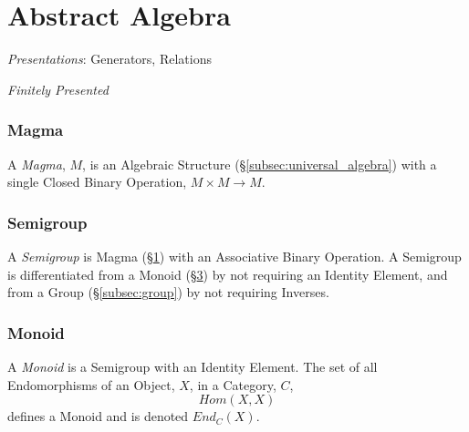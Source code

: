 \part{Abstract Algebra}\label{sec:abstract_algebra}

\emph{Presentations}: Generators, Relations

\emph{Finitely Presented}



\section{Magma}\label{subsec:magma}

A \emph{Magma}, $M$, is an Algebraic Structure
(\S\ref{subsec:universal_algebra}) with a single Closed Binary
Operation, $M \times M \rightarrow M$.



\section{Semigroup}\label{subsec:semigroup}

A \emph{Semigroup} is Magma (\S\ref{subsec:magma}) with an Associative
Binary Operation. A Semigroup is differentiated from a Monoid
(\S\ref{subsec:monoid}) by not requiring an Identity Element, and from
a Group (\S\ref{subsec:group}) by not requiring Inverses.



\section{Monoid}\label{subsec:monoid}

A \emph{Monoid} is a Semigroup with an Identity Element. The set of
all Endomorphisms of an Object, $X$, in a Category, $C$,
\[
    Hom(X,X)
\]
defines a Monoid and is denoted $End_C(X)$.

